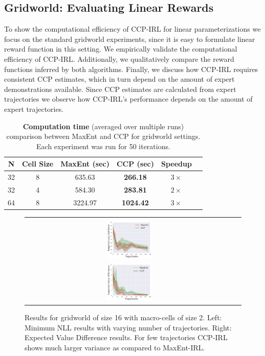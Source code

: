 \documentclass{article}
\def\MSHangBox#1{%
\begin{minipage}[t]{\textwidth}%
\begin{tabbing} %
~\\[-\baselineskip] %
#1 %
\end{tabbing}%
\end{minipage}} %
\begin{document}
\subsection{Gridworld: Evaluating Linear Rewards} 

To show the computational efficiency of CCP-IRL for linear parameterizations we focus on the standard gridworld experiments, since it is easy to formulate linear reward function in this setting. We empirically validate the computational efficiency of CCP-IRL. Additionally, we qualitatively compare the reward functions inferred by both algorithms. Finally, we discuss how CCP-IRL requires consistent CCP estimates, which in turn depend on the amount of expert demonstrations available. Since CCP estimates are calculated from expert trajectories we observe how CCP-IRL's performance depends on the amount of expert trajectories.

\begin{table}[t]
\centering
\def\arraystretch{1.0}%
\begin{tabular}{|c|c|c|c|c|c|}
\hline
N & Cell Size & MaxEnt (sec) & CCP (sec) & Speedup \\\hline

32 & 8 & 635.63 & \textbf{266.18} & $3\times$ \\
32 & 4 & 584.30 & \textbf{283.81} & $2\times$ \\
64 & 8 & 3224.97 & \textbf{1024.42} & $3\times$ \\
\hline
\end{tabular}
\caption{\textbf{Computation time} (averaged over multiple runs) comparison between MaxEnt and CCP for gridworld settings. Each experiment was run for 50 iterations.}
\label{table:table_results_macro_cells}
\end{table}



\begin{figure}[t]
\centering
  \begin{tabular}{cc}
    \MSHangBox{\includegraphics[width=0.22\textwidth]{images/gridworld/macro_cells/grid_16_macro_2_lr_05/ll_ccp_vs_maxent_per_traj.pdf}}&
    \MSHangBox{\includegraphics[width=0.22\textwidth]{images/gridworld/macro_cells/grid_16_macro_2_lr_05/evd_multiple_tries.pdf}}
    \end{tabular}
    \caption{Results for gridworld of size 16 with macro-cells of size 2. Left: Minimum NLL results with varying number of trajectories. Right: Expected Value Difference results. For few trajectories CCP-IRL shows much larger variance as compared to MaxEnt-IRL.}
    \label{fig:img_maxent_vs_ccp_gridworld_macro_cell}
\end{figure}
\end{document}
